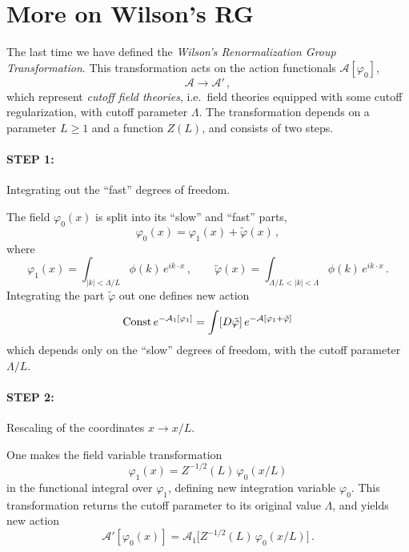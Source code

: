 \section{More on Wilson's RG}

The last time we have defined the \emph{Wilson's Renormalization Group
Transformation}. This transformation acts on the action functionals
$\mathcal A[\varphi_0]$,
\[
\mathcal A\to\mathcal A'\,,
\]
which represent \emph{cutoff field theories}, i.e.\ field theories equipped with
some cutoff regularization, with cutoff parameter $\Lambda$. The transformation
depends on a parameter $L\ge1$ and a function $Z(L)$, and consists of two steps.

\paragraph{STEP 1:} Integrating out the ``fast'' degrees of freedom.

The field $\varphi_0(x)$ is split into its ``slow'' and ``fast'' parts,
\[
\varphi_0(x)=\varphi_1(x)+\tilde\varphi(x)\,,
\]
where
\begin{equation}\label{eq:slowfast}
\varphi_1(x)=\int_{|k|<\Lambda/L}\phi(k)\,e^{ik\cdot x}\,,\qquad
\tilde\varphi(x)=\int_{\Lambda/L<|k|<\Lambda}\phi(k)\,e^{ik\cdot x}\,.
\end{equation}
Integrating the part $\tilde\varphi$ out one defines new action
\begin{equation}\label{eq:A1def}
\text{Const}\,e^{-\mathcal A_1[\varphi_1]}=\int[D\tilde\varphi]\,e^{-\mathcal A[\varphi_1+\tilde\varphi]}
\end{equation}
which depends only on the ``slow'' degrees of freedom, with the cutoff parameter
$\Lambda/L$.

\paragraph{STEP 2:} Rescaling of the coordinates $x\to x/L$.

One makes the field variable transformation
\begin{equation}\label{eq:rescale}
\varphi_1(x)=Z^{-1/2}(L)\,\varphi_0(x/L)
\end{equation}
in the functional integral over $\varphi_1$, defining new integration variable
$\varphi_0$. This transformation returns the cutoff parameter to its original
value $\Lambda$, and yields new action
\begin{equation}\label{eq:Aprime}
\mathcal A'[\varphi_0(x)]=\mathcal A_1\bigl[Z^{-1/2}(L)\,\varphi_0(x/L)\bigr]\,.
\end{equation}

